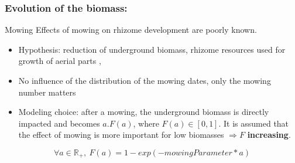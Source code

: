 \documentclass{myBeamer}
\newcommand{\R}{\mathbb R}%
\begin{document}
%




\subsubsection*{Evolution of the biomass:}
%
%
%
%
%
%





\begin{frame}{Mowing}
Effects of mowing on rhizome development are poorly known.
\begin{itemize}
\item Hypothesis: reduction of underground biomass, rhizome resources used for growth of aerial parts \cite{gerber2010evaluating}, \cite{rouifed2011contrasting}
\item No influence of the distribution of the mowing dates, only the mowing number matters \cite{seiger1997mechanical}
\item Modeling choice: after a mowing, the underground biomass is directly impacted and becomes $a.F (a)$, where $F(a) \in [0,1]$. It is assumed that the effect of mowing is more important for low biomasses $ \Rightarrow F$ \textbf{increasing}.
\end{itemize}

\begin{equation*}
\forall a \in \R_+, ~F(a) = 1- exp(-mowingParameter  * a)
\end{equation*} 

\end{frame}
\end{document}

